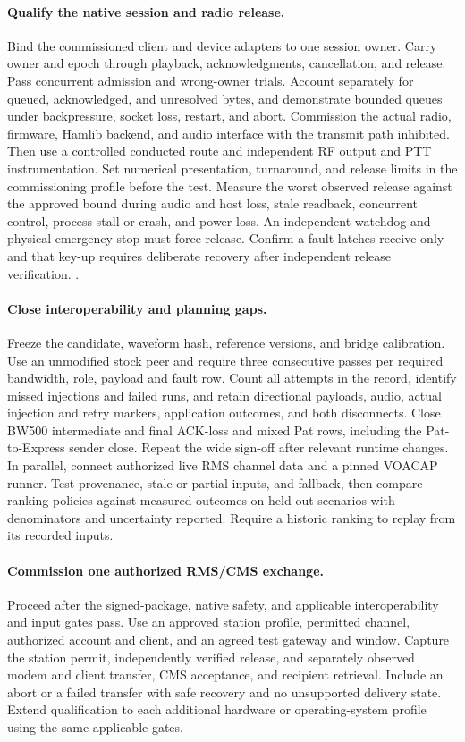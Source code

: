 \paragraph{Qualify the native session and radio release.}
Bind the commissioned client and device adapters to one session owner.
Carry owner and epoch through playback, acknowledgments, cancellation,
and release. Pass concurrent admission and wrong-owner trials. Account
separately for queued, acknowledged, and unresolved bytes, and demonstrate
bounded queues under backpressure, socket loss, restart, and abort.
Commission the actual radio, firmware, Hamlib backend, and audio
interface with the transmit path inhibited. Then use a controlled
conducted route and independent RF output and PTT instrumentation.
Set numerical presentation, turnaround, and release limits in the
commissioning profile before the test. Measure the worst observed
release against the approved bound during audio and host loss, stale
readback, concurrent control, process stall or crash, and power loss.
An independent watchdog and physical emergency stop must force release.
Confirm a fault latches receive-only and that key-up requires deliberate
recovery after independent release verification.
.

\paragraph{Close interoperability and planning gaps.}
Freeze the candidate, waveform hash, reference versions, and bridge
calibration. Use an unmodified stock peer and require three consecutive
passes per required bandwidth, role, payload and fault row. Count all
attempts in the record, identify missed injections and failed runs, and
retain directional payloads, audio, actual injection and retry markers,
application outcomes, and both disconnects. Close BW500 intermediate and
final ACK-loss and mixed Pat rows, including the Pat-to-Express sender
close. Repeat the wide sign-off after relevant runtime changes.
In parallel, connect authorized live RMS channel data and a pinned
VOACAP runner. Test provenance, stale or partial inputs, and fallback,
then compare ranking policies against measured outcomes on held-out
scenarios with denominators and uncertainty reported. Require a historic
ranking to replay from its recorded inputs.

\paragraph{Commission one authorized RMS/CMS exchange.}
Proceed after the signed-package, native safety, and applicable
interoperability and input gates pass. Use an approved station profile,
permitted channel, authorized account and client, and an agreed test
gateway and window. Capture the station permit, independently verified
release, and separately observed modem and client transfer, CMS
acceptance, and recipient retrieval. Include an abort or a failed
transfer with safe recovery and no unsupported delivery state. Extend
qualification to each additional hardware or operating-system profile
using the same applicable gates.

